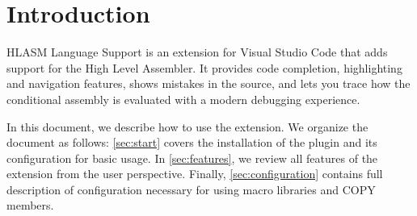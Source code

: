 \section{Introduction}

HLASM Language Support is an extension for Visual Studio Code that adds support for the High Level Assembler. It provides code completion, highlighting and navigation features, shows mistakes in the source, and lets you trace how the conditional assembly is evaluated with a modern debugging experience.

In this document, we describe how to use the extension. We organize the document as follows: \cref{sec:start} covers the installation of the plugin and its configuration for basic usage. In \cref{sec:features}, we review all features of the extension from the user perspective. Finally, \cref{sec:configuration} contains full description of configuration necessary for using macro libraries and COPY members.